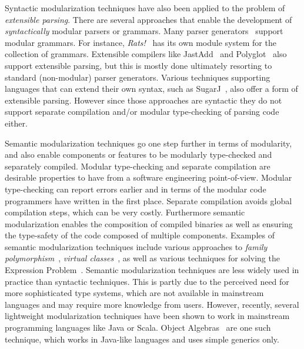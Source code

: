 Syntactic modularization techniques have also been applied to the
problem of \emph{extensible parsing}. There are several approaches
that enable the development of \emph{syntactically} modular parsers or
grammars. Many parser
generators~\cite{antlr1995,Grimm2006,Gouseti2014,Warth2016} support
modular grammars. For instance, \textit{Rats!}~\cite{Grimm2006} has
its own module system for the collection of grammars.  Extensible
compilers like JastAdd~\cite{Ekman2007} and
Polyglot~\cite{Nystrom2003} also support extensible parsing, but this
is mostly done ultimately resorting to standard (non-modular) parser
generators. Various techniques supporting languages that can extend
their own syntax, such as SugarJ~\cite{Erdweg2011}, also offer a form
of extensible parsing. However since those approaches are syntactic
they do not support separate compilation and/or modular type-checking
of parsing code either.

Semantic modularization techniques go one step further in terms of modularity,
and also enable components or features to be modularly type-checked
and separately compiled. Modular type-checking and separate
compilation are desirable properties to have from a software
engineering point-of-view. Modular type-checking can report errors
earlier and in terms of the modular code programmers have written
in the first place. Separate compilation avoids global compilation
steps, which can be very costly. Furthermore semantic modularization
enables the composition of compiled binaries as well as ensuring the
type-safety of the code composed of multiple components. Examples of semantic modularization techniques
include various approaches to \emph{family polymorphism}~\cite{ernst01FP},
\emph{virtual classes}~\cite{Ernst:2006}, as
well as various techniques for solving the Expression
Problem~\cite{torgersen2004expression,odersky2005independently,Oliveira:2012,wang2016expression}.
Semantic modularization techniques are less widely used in practice
than syntactic techniques. This is partly due to the perceived need for more
sophisticated type systems, which are not available in mainstream
languages and may require more knowledge from users. However, recently,
several lightweight modularization techniques have been shown to work
in mainstream programming languages like Java or Scala. Object
Algebras~\cite{Oliveira:2012} are one such technique, which works in
Java-like languages and uses simple generics only.

